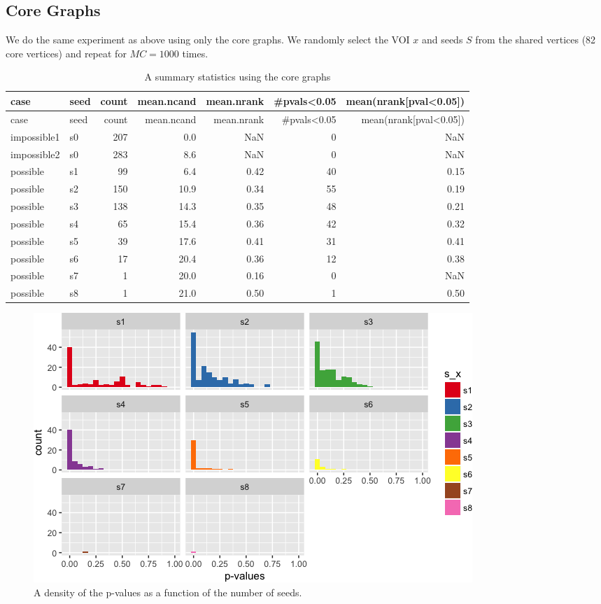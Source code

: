 \documentclass[]{article}
\begin{document}
\subsection{Core Graphs}\label{core-graphs}

We do the same experiment as above using only the core graphs. We
randomly select the VOI \(x\) and seeds \(S\) from the shared vertices
(82 core vertices) and repeat for \(MC=1000\) times.

\begin{longtable}[]{@{}llrrrrr@{}}
\caption{A summary statistics using the core graphs}\tabularnewline
\toprule
case & seed & count & mean.ncand & mean.nrank & \#pvals\textless{}0.05 &
mean(nrank{[}pval\textless{}0.05{]})\tabularnewline
\midrule
\endfirsthead
\toprule
case & seed & count & mean.ncand & mean.nrank & \#pvals\textless{}0.05 &
mean(nrank{[}pval\textless{}0.05{]})\tabularnewline
\midrule
\endhead
impossible1 & s0 & 207 & 0.0 & NaN & 0 & NaN\tabularnewline
impossible2 & s0 & 283 & 8.6 & NaN & 0 & NaN\tabularnewline
possible & s1 & 99 & 6.4 & 0.42 & 40 & 0.15\tabularnewline
possible & s2 & 150 & 10.9 & 0.34 & 55 & 0.19\tabularnewline
possible & s3 & 138 & 14.3 & 0.35 & 48 & 0.21\tabularnewline
possible & s4 & 65 & 15.4 & 0.36 & 42 & 0.32\tabularnewline
possible & s5 & 39 & 17.6 & 0.41 & 31 & 0.41\tabularnewline
possible & s6 & 17 & 20.4 & 0.36 & 12 & 0.38\tabularnewline
possible & s7 & 1 & 20.0 & 0.16 & 0 & NaN\tabularnewline
possible & s8 & 1 & 21.0 & 0.50 & 1 & 0.50\tabularnewline
\bottomrule
\end{longtable}

\begin{figure}
\centering
\includegraphics{vn_files/figure-latex/pval-1.png}
\caption{A density of the p-values as a function of the number of
seeds.}
\end{figure}
\end{document}

